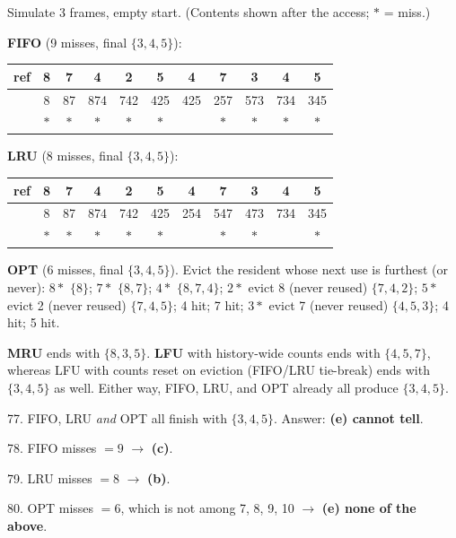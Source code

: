 \documentclass[11pt,a4paper]{article}
\newenvironment{Sol}{%
  \begin{tcolorbox}[sboxstyle, title={Solution}]%
}{%
  \end{tcolorbox}\vspace{0.35em}%
}
\begin{document}
\begin{Sol}
Simulate 3 frames, empty start. (Contents shown after the access; $*$ =
miss.)

\textbf{FIFO} (9 misses, final $\{3,4,5\}$):
\begin{center}
\small
\begin{tabular}{c|cccccccccc}
ref & 8 & 7 & 4 & 2 & 5 & 4 & 7 & 3 & 4 & 5 \\
\hline
    & 8 & 87& 874& 742& 425& 425& 257& 573& 734& 345 \\
    & $*$& $*$& $*$& $*$& $*$&  & $*$& $*$& $*$& $*$ \\
\end{tabular}
\end{center}

\textbf{LRU} (8 misses, final $\{3,4,5\}$):
\begin{center}
\small
\begin{tabular}{c|cccccccccc}
ref & 8 & 7 & 4 & 2 & 5 & 4 & 7 & 3 & 4 & 5 \\
\hline
    & 8 & 87& 874& 742& 425& 254& 547& 473& 734& 345 \\
    & $*$& $*$& $*$& $*$& $*$&  & $*$& $*$&  & $*$ \\
\end{tabular}
\end{center}

\textbf{OPT} (6 misses, final $\{3,4,5\}$). Evict the resident whose
next use is furthest (or never):
$8*$ $\{8\}$;
$7*$ $\{8,7\}$;
$4*$ $\{8,7,4\}$;
$2*$ evict 8 (never reused) $\{7,4,2\}$;
$5*$ evict 2 (never reused) $\{7,4,5\}$;
4 hit; 7 hit;
$3*$ evict 7 (never reused) $\{4,5,3\}$;
4 hit; 5 hit.

\textbf{MRU} ends with $\{8,3,5\}$. \textbf{LFU} with history-wide
counts ends with $\{4,5,7\}$, whereas LFU with counts reset on eviction
(FIFO/LRU tie-break) ends with $\{3,4,5\}$ as well. Either way, FIFO,
LRU, and OPT already all produce $\{3,4,5\}$.

77. FIFO, LRU \emph{and} OPT all finish with $\{3,4,5\}$.
Answer: \textbf{(e) cannot tell}.

78. FIFO misses $=9$ $\to$ \textbf{(c)}.

79. LRU misses $=8$ $\to$ \textbf{(b)}.

80. OPT misses $=6$, which is not among 7, 8, 9, 10 $\to$
\textbf{(e) none of the above}.
\end{Sol}
\end{document}
